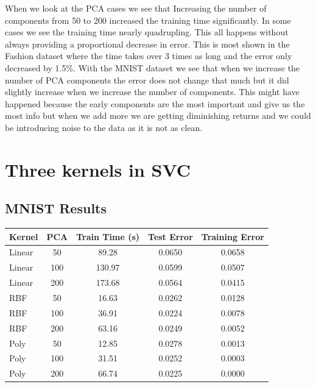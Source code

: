 \documentclass{article}
\begin{document}
When we look at the PCA cases we see that Increasing the number of components from 50 to 200 increased the training time significantly. In some cases we see the training time nearly quadrupling. This all happens without always providing a proportional decrease in error. This is most shown in the Fashion dataset where the time takes over 3 times as long and the error only decreased by 1.5\%. With the MNIST dataset we see that when we increase the number of PCA components the error does not change that much but it did slightly increase when we increase the number of components. This might have happened because the early components are the most important and give us the most info but when we add more we are getting diminishing returns and we could be introducing noise to the data as it is not as clean.  


\section{Three kernels in SVC}
\subsection*{MNIST Results}
\begin{center}
\begin{tabular}{lcccc}
\toprule
Kernel & PCA & Train Time (s) & Test Error & Training Error \\
\midrule
Linear & 50  & 89.28  & 0.0650 & 0.0658 \\
Linear & 100 & 130.97 & 0.0599 & 0.0507 \\
Linear & 200 & 173.68 & 0.0564 & 0.0415 \\
\midrule
RBF    & 50  & 16.63  & 0.0262 & 0.0128 \\
RBF    & 100 & 36.91 & 0.0224 & 0.0078 \\
RBF    & 200 & 63.16 & 0.0249 & 0.0052 \\
\midrule
Poly   & 50  & 12.85  & 0.0278 & 0.0013 \\
Poly   & 100 & 31.51  & 0.0252 & 0.0003 \\
Poly   & 200 & 66.74  & 0.0225 & 0.0000 \\
\bottomrule
\end{tabular}
\end{center}
\end{document}
